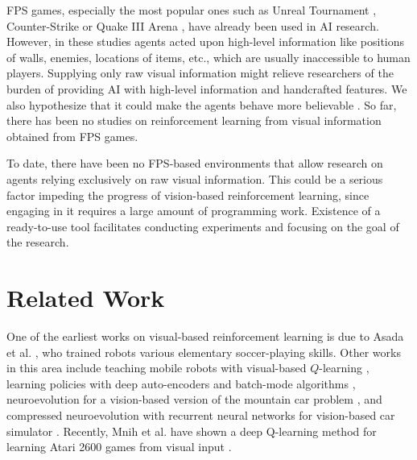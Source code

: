 \documentclass[english,american,conference, balance]{IEEEtran}
\begin{document}
\begin{comment}
Paragraph 4 and 5: 

Why is the problem important?

Why is the problem hard?

At a high level what are the differences in what you are doing, and
what others have done? Keep this at a high level, you can refer to
a future section where specific details and differences will be given.
But it is important for the reader to know at a high level, what is
new about this work compared to other work in the area.
\end{comment}

FPS games, especially the most popular ones such as Unreal Tournament
\cite{6314567,6922494}, Counter-Strike \cite{5035619} or Quake III
Arena \cite{el2007hybrid}, have already been used in AI research.
However, in these studies agents acted upon high-level information
like positions of walls, enemies, locations of items, etc., which
are usually inaccessible to human players. Supplying only raw visual
information might relieve researchers of the burden of providing AI
with high-level information and handcrafted features. We also hypothesize
that it could make the agents behave more believable \cite{karpov:believablebots12}.
So far, there has been no studies on reinforcement learning from visual
information obtained from FPS games.

To date, there have been no FPS-based environments that allow research
on agents relying exclusively on raw visual information. This could
be a serious factor impeding the progress of vision-based reinforcement
learning, since engaging in it requires a large amount of programming
work. Existence of a ready-to-use tool facilitates conducting experiments
and focusing on the goal of the research.


\section{Related Work\label{sec:Related-Work}}

\begin{comment}
Vision-based reinforcement learning
\end{comment}
One of the earliest works on visual-based reinforcement learning is
due to Asada et al. \cite{asada1994vision,asada1996purposive}, who
trained robots various elementary soccer-playing skills. Other works
in this area include teaching mobile robots with visual-based $Q$-learning
\cite{gaskett2000reinforcement}, learning policies with deep auto-encoders
and batch-mode algorithms \cite{lange2010deep}, neuroevolution for
a vision-based version of the mountain car problem \cite{cuccu2011intrinsically},
and compressed neuroevolution with recurrent neural networks for vision-based
car simulator \cite{koutnik2014evolving}. Recently, Mnih et al. have
shown a deep Q-learning method for learning Atari 2600 games from
visual input \cite{mnih-dqn-2015}.
\end{document}
